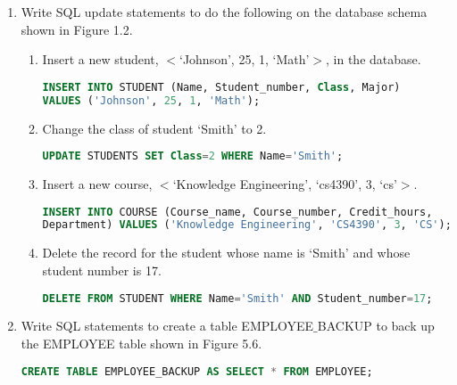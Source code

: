 \documentclass[12pt]{article}
\begin{document}
\begin{enumerate}
	\item Write SQL update statements to do the following on the database schema shown in Figure 1.2.
	\begin{enumerate}
		\item Insert a new student, $<$‘Johnson’, 25, 1, ‘Math’$>$, in the database.
		\begin{lstlisting}[language=sql]
INSERT INTO STUDENT (Name, Student_number, Class, Major) 
VALUES ('Johnson', 25, 1, 'Math');
		\end{lstlisting}	
		\item Change the class of student ‘Smith’ to 2.
		\begin{lstlisting}[language=sql]
UPDATE STUDENTS SET Class=2 WHERE Name='Smith';
		\end{lstlisting}	
		\item Insert a new course, $<$‘Knowledge Engineering’, ‘cs4390’, 3, ‘cs’$>$.
		\begin{lstlisting}[language=sql]
INSERT INTO COURSE (Course_name, Course_number, Credit_hours, 
Department) VALUES ('Knowledge Engineering', 'CS4390', 3, 'CS');
		\end{lstlisting}	
		\item Delete the record for the student whose name is ‘Smith’ and whose student number is 17.
		\begin{lstlisting}[language=sql]
DELETE FROM STUDENT WHERE Name='Smith' AND Student_number=17;
		\end{lstlisting}	
	\end{enumerate}
	
	\item Write SQL statements to create a table EMPLOYEE$\_$BACKUP to back up the EMPLOYEE table shown in Figure 5.6.
			\begin{lstlisting}[language=sql]
CREATE TABLE EMPLOYEE_BACKUP AS SELECT * FROM EMPLOYEE;
		\end{lstlisting}

\end{enumerate}
\end{document}
